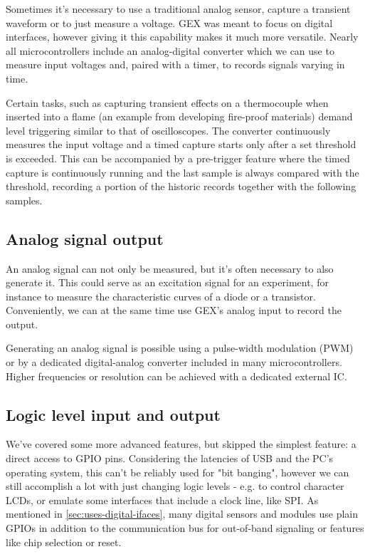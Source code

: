 Sometimes it's necessary to use a traditional analog sensor, capture a transient waveform or to just measure a voltage. GEX was meant to focus on digital interfaces, however giving it this capability makes it much more versatile. Nearly all microcontrollers include an analog-digital converter which we can use to measure input voltages and, paired with a timer, to records signals varying in time.

Certain tasks, such as capturing transient effects on a thermocouple when inserted into a flame (an example from developing fire-proof materials) demand level triggering similar to that of oscilloscopes. The converter continuously measures the input voltage and a timed capture starts only after a set threshold is exceeded. This can be accompanied by a pre-trigger feature where the timed capture is continuously running and the last sample is always compared with the threshold, recording a portion of the historic records together with the following samples.

\subsection{Analog signal output}

An analog signal can not only be measured, but it's often necessary to also generate it. This could serve as an excitation signal for an experiment, for instance to measure the characteristic curves of a diode or a transistor. Conveniently, we can at the same time use GEX's analog input to record the output.

Generating an analog signal is possible using a pulse-width modulation (PWM) or by a dedicated digital-analog converter included in many microcontrollers. Higher frequencies or resolution can be achieved with a dedicated external IC.

\subsection{Logic level input and output}

We've covered some more advanced features, but skipped the simplest feature: a direct access to GPIO pins. Considering the latencies of USB and the PC's operating system, this can't be reliably used for "bit banging", however we can still accomplish a lot with just changing logic levels - e.g. to control character LCDs, or emulate some interfaces that include a clock line, like SPI. As mentioned in \ref{sec:uses-digital-ifaces}, many digital sensors and modules use plain GPIOs in addition to the communication bus for out-of-band signaling or features like chip selection or reset.

